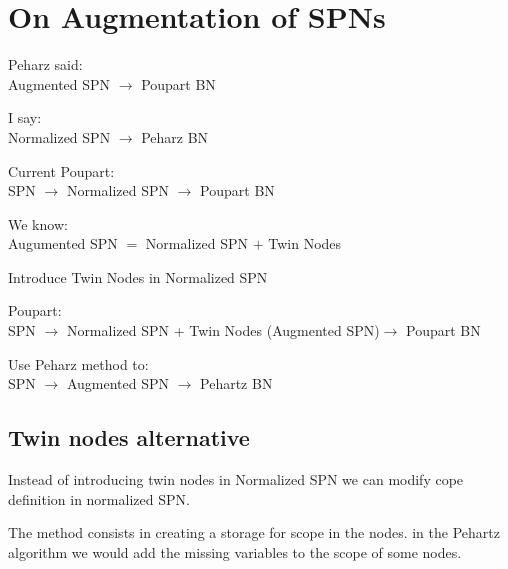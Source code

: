 \clearpage
\section{On Augmentation of SPNs}

Peharz said: \\
Augmented SPN $\rightarrow$ Poupart BN

I say: \\
Normalized SPN $\rightarrow$ Peharz BN

Current Poupart:\\
	SPN $\rightarrow$ Normalized SPN $\rightarrow$ Poupart BN

We know:\\
	Augumented SPN $=$ Normalized SPN $+$ Twin Nodes
	

Introduce Twin Nodes in Normalized SPN

Poupart:\\
	SPN $\rightarrow$ Normalized SPN + Twin Nodes (Augmented SPN)$\rightarrow$ Poupart BN
	
Use Peharz method to:\\
	SPN $\rightarrow$ Augmented SPN $\rightarrow$ Pehartz BN
	
\subsection{Twin nodes alternative}

Instead of introducing twin nodes in Normalized SPN we can modify cope definition in normalized SPN.

The method consists in creating a storage for scope in the nodes.
in the Pehartz algorithm we would add the missing variables to the scope of some nodes.